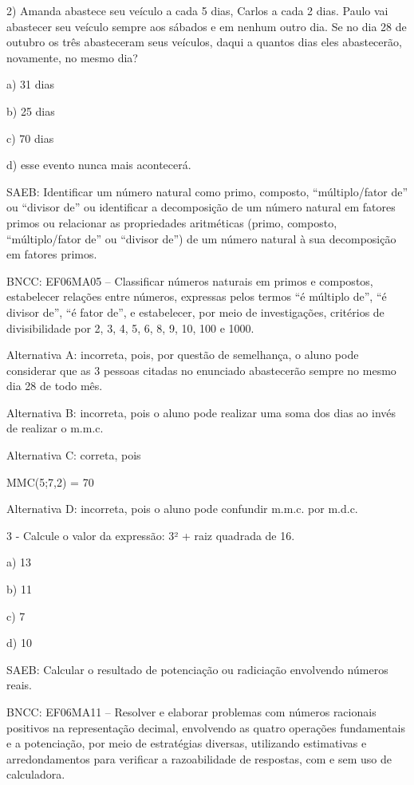 2) Amanda abastece seu veículo a cada 5 dias, Carlos a cada 2 dias.
Paulo vai abastecer seu veículo sempre aos sábados e em nenhum outro
dia. Se no dia 28 de outubro os três abasteceram seus veículos, daqui a
quantos dias eles abastecerão, novamente, no mesmo dia?

a) 31 dias

b) 25 dias

c) 70 dias

d) esse evento nunca mais acontecerá.

SAEB: Identificar um número natural como primo, composto,
``múltiplo/fator de'' ou ``divisor de'' ou identificar a decomposição de
um número natural em fatores primos ou relacionar as propriedades
aritméticas (primo, composto, ``múltiplo/fator de'' ou ``divisor de'')
de um número natural à sua decomposição em fatores primos.

BNCC: EF06MA05 -- Classificar números naturais em primos e compostos,
estabelecer relações entre números, expressas pelos termos ``é múltiplo
de'', ``é divisor de'', ``é fator de'', e estabelecer, por meio de
investigações, critérios de divisibilidade por 2, 3, 4, 5, 6, 8, 9, 10,
100 e 1000.

Alternativa A: incorreta, pois, por questão de semelhança, o aluno pode
considerar que as 3 pessoas citadas no enunciado abastecerão sempre no
mesmo dia 28 de todo mês.

Alternativa B: incorreta, pois o aluno pode realizar uma soma dos dias
ao invés de realizar o m.m.c.

Alternativa C: correta, pois

MMC(5;7,2) = 70

Alternativa D: incorreta, pois o aluno pode confundir m.m.c. por m.d.c.

3 - Calcule o valor da expressão: 3² + raiz quadrada de 16.

a) 13

b) 11

c) 7

d) 10

SAEB: Calcular o resultado de potenciação ou radiciação envolvendo
números reais.

BNCC: EF06MA11 -- Resolver e elaborar problemas com números racionais
positivos na representação decimal, envolvendo as quatro operações
fundamentais e a potenciação, por meio de estratégias diversas,
utilizando estimativas e arredondamentos para verificar a razoabilidade
de respostas, com e sem uso de calculadora.

